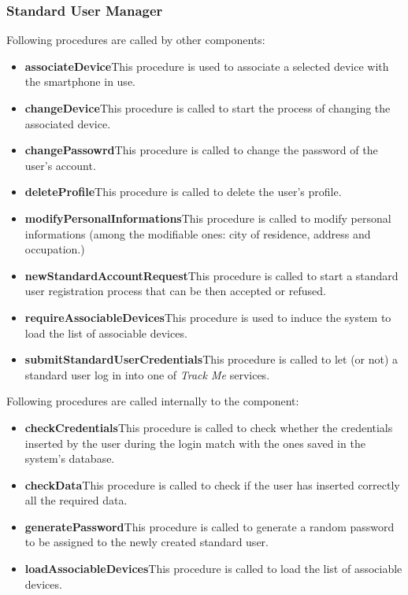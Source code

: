 \subsubsection{Standard User Manager}
Following procedures are called by other components:
\begin{itemize}
  \item \textbf{associateDevice}\quad This procedure is used to associate a selected device with the smartphone in use.
  \item \textbf{changeDevice}\quad This procedure is called to start the process of changing the associated device.
  \item \textbf{changePassowrd}\quad This procedure is called to change the password of the user's account.
  \item \textbf{deleteProfile}\quad This procedure is called to delete the user's profile.
  \item \textbf{modifyPersonalInformations}\quad This procedure is called to modify personal informations (among the modifiable ones:  city of residence, address and occupation.)
  \item \textbf{newStandardAccountRequest}\quad This procedure is called to start a standard user registration process that can be then accepted or refused.
  \item \textbf{requireAssociableDevices}\quad This procedure is used to induce the system to load the list of associable devices.
  \item \textbf{submitStandardUserCredentials}\quad This procedure is called to let (or not) a standard user log in into one of \textit{Track Me} services.
\end{itemize}

\myparagraph{}
Following procedures are called internally to the component:
\begin{itemize}
  \item \textbf{checkCredentials}\quad This procedure is called to check whether the credentials inserted by the user during the login match with the ones saved in the system's database.
  \item \textbf{checkData}\quad This procedure is called to check if the user has inserted correctly all the required data.
  \item \textbf{generatePassword}\quad This procedure is called to generate a random password to be assigned to the newly created standard user.
  \item \textbf{loadAssociableDevices}\quad This procedure is called to load the list of associable devices.
\end{itemize}


